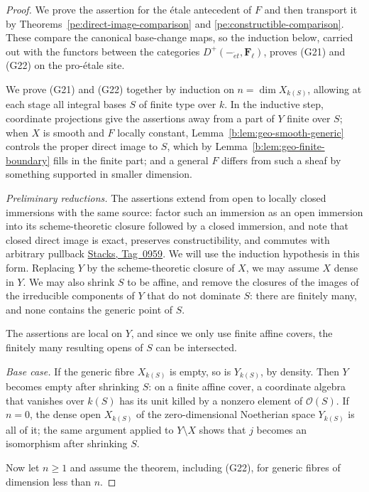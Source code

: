 \documentclass[11pt,a4paper]{article}
\numberwithin{equation}{section}
\theoremstyle{definition}
\theoremstyle{remark}
\newcommand{\Fell}{\mathbf F_\ell}
\newcommand{\et}{\acute{e}t}
\newcommand{\stacks}[1]{\href{https://stacks.math.columbia.edu/tag/#1}{\textnormal{Stacks, Tag~#1}}}
\begin{document}
\begin{proof}
We prove the assertion for the \'etale antecedent of $F$ and then
transport it by Theorems~\ref{pe:direct-image-comparison} and
\ref{pe:constructible-comparison}. These compare the canonical
base-change maps, so the induction below, carried out with the functors
between the categories \(D^+(-_{\et},\Fell)\), proves (G21) and (G22)
on the pro-\'etale site.

We prove (G21) and (G22) together by induction on
\(n=\dim X_{k(S)}\), allowing at each stage all integral bases \(S\) of
finite type over \(k\). In the inductive step, coordinate projections
give the assertions away from a part of \(Y\) finite over \(S\); when
\(X\) is smooth and \(F\) locally constant,
Lemma~\ref{b:lem:geo-smooth-generic} controls the proper direct image
to \(S\), which by Lemma~\ref{b:lem:geo-finite-boundary} fills in the
finite part; and a general \(F\) differs from such a sheaf by something
supported in smaller dimension.

\emph{Preliminary reductions.} The assertions extend from open to
locally closed immersions with the same source: factor such an
immersion as an open immersion into its scheme-theoretic closure
followed by a closed immersion, and note that closed direct image is
exact, preserves constructibility, and commutes with arbitrary pullback
\stacks{0959}. We will use the induction hypothesis in this form.
Replacing \(Y\) by the scheme-theoretic closure of \(X\), we may assume
\(X\) dense in \(Y\). We may also shrink \(S\) to be affine, and remove
the closures of the images of the irreducible components of \(Y\) that
do not dominate \(S\): there are finitely many, and none contains the
generic point of \(S\).

The assertions are local on \(Y\), and since we only use finite affine
covers, the finitely many resulting opens of \(S\) can be intersected.

\emph{Base case.} If the generic fibre \(X_{k(S)}\) is empty, so is
\(Y_{k(S)}\), by density. Then \(Y\) becomes empty after shrinking
\(S\): on a finite affine cover, a coordinate algebra that vanishes
over \(k(S)\) has its unit killed by a nonzero element of
\(\mathcal O(S)\). If \(n=0\), the dense open \(X_{k(S)}\) of the
zero-dimensional Noetherian space \(Y_{k(S)}\) is all of it; the same
argument applied to \(Y\setminus X\) shows that \(j\) becomes an
isomorphism after shrinking \(S\).

Now let \(n\geq1\) and assume the theorem, including (G22), for
generic fibres of dimension less than \(n\).


\end{proof}
\end{document}
